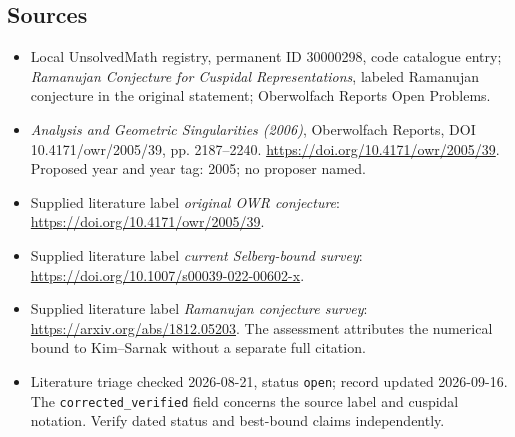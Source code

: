 \documentclass[11pt]{article}
\begin{document}
\subsection{Sources}
\begin{itemize}\item Local UnsolvedMath registry, permanent ID 30000298, code catalogue entry; \emph{Ramanujan Conjecture for Cuspidal Representations}, labeled Ramanujan conjecture in the original statement; Oberwolfach Reports Open Problems.\item \emph{Analysis and Geometric Singularities (2006)}, Oberwolfach Reports, DOI 10.4171/owr/2005/39, pp. 2187--2240. \url{https://doi.org/10.4171/owr/2005/39}. Proposed year and year tag: 2005; no proposer named.\item Supplied literature label \emph{original OWR conjecture}: \url{https://doi.org/10.4171/owr/2005/39}.\item Supplied literature label \emph{current Selberg-bound survey}: \url{https://doi.org/10.1007/s00039-022-00602-x}.\item Supplied literature label \emph{Ramanujan conjecture survey}: \url{https://arxiv.org/abs/1812.05203}. The assessment attributes the numerical bound to Kim--Sarnak without a separate full citation.\item Literature triage checked 2026-08-21, status \texttt{open}; record updated 2026-09-16. The \texttt{corrected\_verified} field concerns the source label and cuspidal notation. Verify dated status and best-bound claims independently.\end{itemize}
\end{document}
